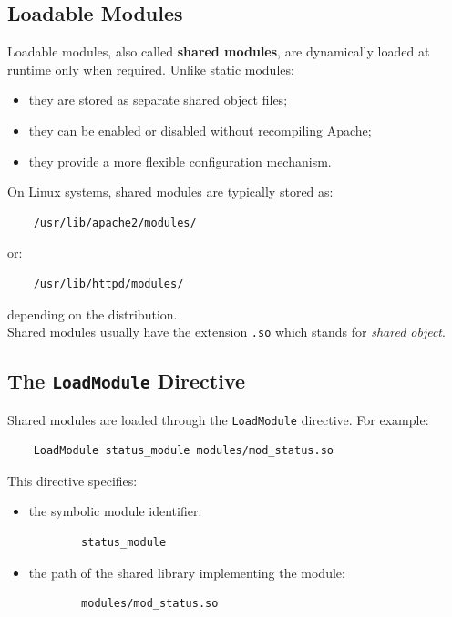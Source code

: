 \documentclass{scrbook}
\begin{document}
	\subsection{Loadable Modules}
	
	Loadable modules, also called \textbf{shared modules}, are dynamically loaded at runtime only when required. Unlike static modules:
	\begin{itemize}
		\item they are stored as separate shared object files;
		
		\item they can be enabled or disabled without recompiling Apache;
		
		\item they provide a more flexible configuration mechanism.
	\end{itemize}
	
	On Linux systems, shared modules are typically stored as:
	
	\begin{lstlisting}
	/usr/lib/apache2/modules/
	\end{lstlisting}
	
	or:
	
	\begin{lstlisting}
	/usr/lib/httpd/modules/
	\end{lstlisting}
	
	depending on the distribution.\\
	
	Shared modules usually have the extension \texttt{.so} which stands for \textit{shared object}.
	
	\subsection{The \texttt{LoadModule} Directive}
	
	Shared modules are loaded through the \texttt{LoadModule} directive. For example:
	
	\begin{lstlisting}
	LoadModule status_module modules/mod_status.so
	\end{lstlisting}
	
	This directive specifies:
	\begin{itemize}
		\item the symbolic module identifier:
		\begin{lstlisting}
		status_module
		\end{lstlisting}
		
		\item the path of the shared library implementing the module:
		\begin{lstlisting}
		modules/mod_status.so
		\end{lstlisting}
	\end{itemize}
	
\end{document}
